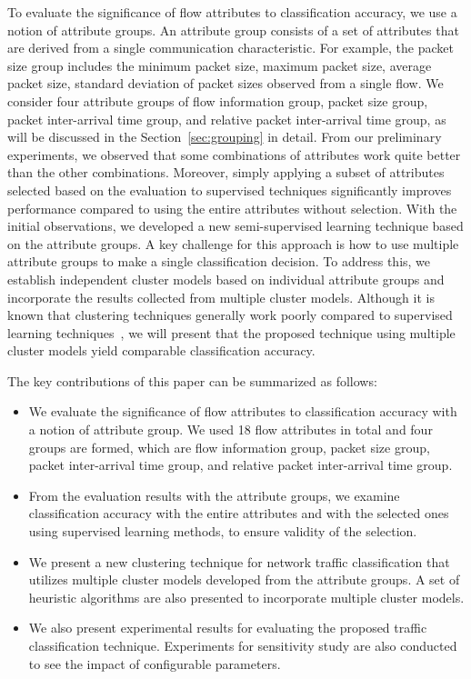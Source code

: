 \documentclass[conference]{IEEEtran}
\begin{document}
To evaluate the significance of flow attributes to classification accuracy, we use a notion of attribute groups.
An attribute group consists of a set of attributes that are derived from a single communication characteristic.
For example, the packet size group includes the minimum packet size, maximum packet size, average packet size, standard deviation of packet sizes observed from a single flow.
We consider four attribute groups of flow information group, packet size group, packet inter-arrival time group, and relative packet inter-arrival time group, as will be discussed in the Section~\ref{sec:grouping} in detail.
From our preliminary experiments, we observed that some combinations of attributes work quite better than the other combinations.
Moreover, simply applying a subset of attributes selected based on the evaluation to supervised techniques significantly improves performance compared to using the entire attributes without selection.
With the initial observations, we developed a new semi-supervised learning technique based on the attribute groups.
A key challenge for this approach is how to use multiple attribute groups to make a single classification decision.
To address this, we establish independent cluster models based on individual attribute groups and incorporate the results collected from multiple cluster models.
Although it is known that clustering techniques generally work poorly compared to supervised learning techniques~\cite{DBLP:conf/infocom/XieIKFN12}, we will present that the proposed technique using multiple cluster models yield comparable classification accuracy.

The key contributions of this paper can be summarized as follows:

\begin{itemize}
	\item We evaluate the significance of flow attributes to classification accuracy with a notion of attribute group.
	We used 18 flow attributes in total and four groups are formed, which are flow information group, packet size group, packet inter-arrival time group, and relative packet inter-arrival time group.
	\item From the evaluation results with the attribute groups, we examine classification accuracy with the entire attributes and with the selected ones using supervised learning methods, to ensure  validity of the selection.
	\item We present a new clustering technique for network traffic classification that utilizes multiple cluster models developed from the attribute groups. A set of heuristic algorithms are also presented to incorporate multiple cluster models.
	\item We also present experimental results for evaluating the proposed traffic classification technique. Experiments for sensitivity study are also conducted to see the impact of configurable parameters.
\end{itemize}
\end{document}
